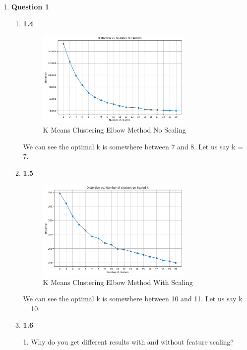 \documentclass[12pt]{article}
\begin{document}
\begin{enumerate}
  \item \textbf{Question 1}
  \begin{enumerate}
    \item \textbf{1.4}
      \begin{figure}[H]
        \centering 
        \includegraphics[width=0.75\textwidth]{1_4.png}
        \caption{K Means Clustering Elbow Method No Scaling}
      \end{figure}

      We can see the optimal k is somewhere between 7 and 8. Let us say k = 7. 
    \item \textbf{1.5}
    
    \begin{figure}[H]
      \centering 
      \includegraphics[width=0.75\textwidth]{1_5.png}
      \caption{K Means Clustering Elbow Method With Scaling}
    \end{figure}

    We can see the optimal k is somewhere between 10 and 11. Let us say k = 10. 

    \item \textbf{1.6}
    
    1. Why do you get different results with and without feature scaling? \\ 


\end{enumerate}
\end{enumerate}
\end{document}
